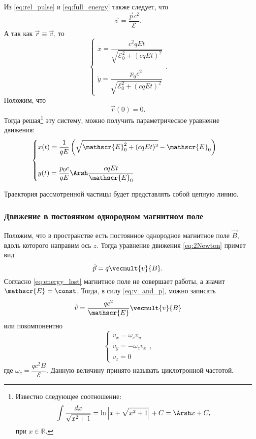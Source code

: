 Из \eqref{eq:rel_pulse} и \eqref{eq:full_energy} также следует, что 
\begin{equation}
\vec{v} = \frac{\vec{p}c^2}{\mathscr{E}}.
\label{eq:v_and_p}
\end{equation}
А так как $\dot{\vec{r}} \equiv  \vec{v}$, то
\begin{equation*}
\begin{cases}
\dot{x} = \dfrac{c^2qEt}{\sqrt{\mathscr{E}_0^2 + (cqEt)^2}} \\ \\
\dot{y} = \dfrac{p_0c^2}{\sqrt{\mathscr{E}_0^2 + (cqEt)^2}}
\end{cases}.
\end{equation*}
Положим, что $$\vec{r}(0) = 0.$$ Тогда решая\footnote{Известно \cite{fiht2} следующее соотношение: $$\int \frac{dx}{\sqrt{x^2 + 1}} = \ln \left| x + \sqrt{x^2 + 1} \right| + C = \Arsh x + C,$$ при $x \in \mathbb{R}$.}
 эту систему, можно получить параметрическое уравнение движения:
\begin{equation}
\begin{cases}
x(t) = \dfrac{1}{qE} \left(\sqrt{\mathscr{E}_0^2 + (cqEt)^2 } - \mathscr{E}_0 \right)  \\ \\
y(t) = \dfrac{p_0c}{qE} \Arsh \dfrac{cqEt}{\mathscr{E}_0}
\end{cases}
\label{eq:analytical12}
\end{equation}

Траектория рассмотренной частицы будет представлять собой цепную линию.

\subsubsection{Движение в постоянном однородном магнитном поле}

Положим, что в пространстве есть постоянное однородное магнитное поле $\vec{B}$, вдоль которого направим ось $z$. Тогда уравнение движения \eqref{eq:2Newton} примет вид
\begin{equation*}
\dot{\vec{p}} = q \vecmult{v}{B}.
\end{equation*}
Согласно \eqref{eq:energy_lost} магнитное поле не совершает работы, а значит $ \mathscr{E} = \const$. Тогда, в силу \eqref{eq:v_and_p}, можно записать
\begin{equation}
\dot{\vec{v}} = \frac{qc^2}{\mathscr{E}} \vecmult{v}{B}
\end{equation}
или покомпонентно
\begin{equation}
\begin{cases}
\dot{v}_x = \omega_c v_y\\
\dot{v}_y = - \omega_c v_x\\
\dot{v}_z = 0
\end{cases},
\label{eq:system_B_only}
\end{equation}
где $\omega_c = \dfrac{qc^2B}{\mathscr{E}}$. Данную величину принято \cite{dnestrovsky} называть циклотронной частотой.

